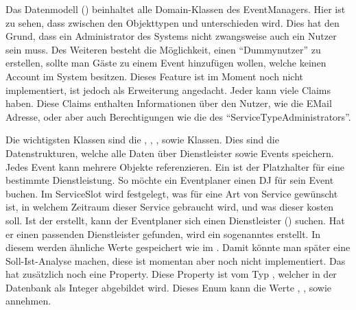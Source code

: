 

Das Datenmodell () beinhaltet alle Domain-Klassen des EventManagers. Hier ist zu sehen, dass zwischen den Objekttypen  und  unterschieden wird. Dies hat den Grund, dass ein Administrator des Systems nicht zwangsweise auch ein Nutzer sein muss. Des Weiteren besteht die Möglichkeit, einen \enquote{Dummynutzer} zu erstellen, sollte man Gäste zu einem Event hinzufügen wollen, welche keinen Account im System besitzen. Dieses Feature ist im Moment noch nicht implementiert, ist jedoch als Erweiterung angedacht. Jeder  kann viele Claims haben. Diese Claims enthalten Informationen über den Nutzer, wie \zB die EMail Adresse, oder aber auch Berechtigungen wie die des \enquote{ServiceTypeAdministrators}.


Die wichtigsten Klassen sind die , , ,  sowie  Klassen. Dies sind die Datenstrukturen, welche alle Daten über Dienstleister sowie Events speichern. Jedes Event kann mehrere  Objekte referenzieren. Ein  ist der Platzhalter für eine bestimmte Dienstleistung. So möchte \zB ein Eventplaner einen DJ für sein Event buchen. Im ServiceSlot wird festgelegt, was für eine Art von Service gewünscht ist, in welchem Zeitraum dieser Service gebraucht wird, und was dieser kosten soll. Ist der  erstellt, kann der Eventplaner sich einen Dienstleister () suchen. Hat er einen passenden Dienstleister gefunden, wird ein sogenanntes  erstellt. In diesem  werden ähnliche Werte gespeichert wie im . Damit könnte man später eine Soll-Ist-Analyse machen, diese ist momentan aber noch nicht implementiert. Das  hat zusätzlich noch eine  Property. Diese Property ist vom Typ , welcher in der Datenbank als Integer abgebildet wird. Dieses Enum kann die Werte , ,  sowie  annehmen.

